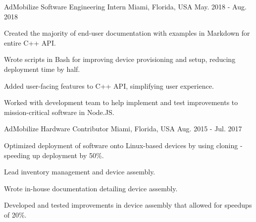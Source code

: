 \begin{cventries}
  \cventry
    {AdMobilize} %
    {Software Engineering Intern} %
    {Miami, Florida, USA} %
    {May. 2018 - Aug. 2018} %
    {
      \begin{cvitems} %
        \item {Created the majority of end-user documentation with examples in Markdown for entire C++ API.}
        \item {Wrote scripts in Bash for improving device provisioning and setup, reducing deployment time by half.}
        \item {Added user-facing features to C++ API, simplifying user experience.}
        \item {Worked with development team to help implement and test improvements to mission-critical software in Node.JS.}
      \end{cvitems}
    }

  \cventry
    {AdMobilize} %
    {Hardware Contributor} %
    {Miami, Florida, USA} %
    {Aug. 2015 - Jul. 2017} %
    {
      \begin{cvitems} %
        \item {Optimized deployment of software onto Linux-based devices by using cloning - speeding up deployment by 50\%.}
        \item {Lead inventory management and device assembly.}
        \item {Wrote in-house documentation detailing device assembly.}
        \item {Developed and tested improvements in device assembly that allowed for speedups of 20\%.}
      \end{cvitems}
    }

\end{cventries}
